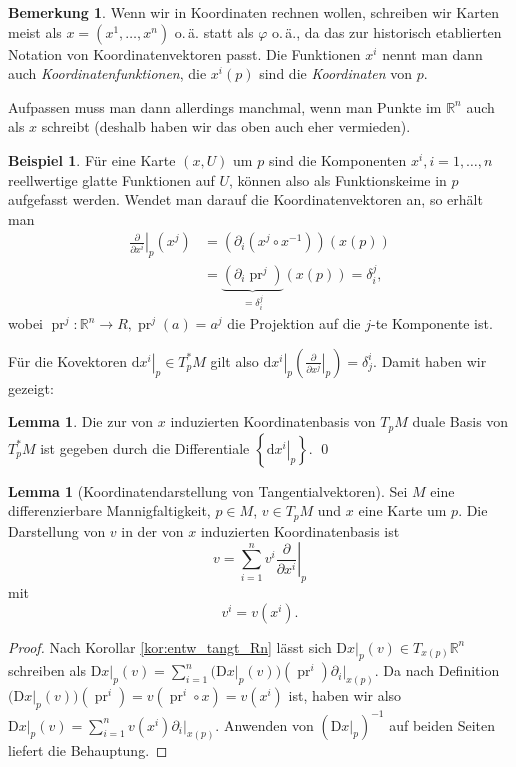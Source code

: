 \documentclass[a4paper]{scrreprt}
\numberwithin{equation}{chapter}
\newcommand{\D}{\mathrm{d}}
\newcommand{\DD}{\mathrm{D}}
\DeclareMathOperator{\pr}{pr}
\newcommand{\R}{\mathbb{R}}
\theoremstyle{definition}
\newtheorem{lemma}[defn]{Lemma}
\newtheorem{bem}[defn]{Bemerkung}
\newtheorem{bsp}[defn]{Beispiel}
\begin{document}
\begin{bem}
	Wenn wir in Koordinaten rechnen wollen, schreiben wir Karten meist als $x = (x^1, \dots, x^n)$ o.\,ä. statt als $\varphi$ o.\,ä., da das zur historisch etablierten Notation von Koordinatenvektoren passt. Die Funktionen $x^i$ nennt man dann auch \emph{Koordinatenfunktionen}, die $x^i(p)$ sind die \emph{Koordinaten} von $p$.

	Aufpassen muss man dann allerdings manchmal, wenn man Punkte im $\mathbb R^n$ auch als $x$ schreibt (deshalb haben wir das oben auch eher vermieden).
\end{bem}

\begin{bsp}
	Für eine Karte $(x,U)$ um $p$ sind die Komponenten $x^i, i = 1,\dots, n$ reellwertige glatte Funktionen auf $U$, können also als Funktionskeime in $p$ aufgefasst werden. Wendet man darauf die Koordinatenvektoren an, so erhält man
	\begin{align*}
		\left.\frac{\partial}{\partial x^i}\right|_p (x^j) &= \left(\partial_i \left(x^j\circ x^{-1}\right)\right) (x(p))\\
		&= \underbrace{\left(\partial_i \pr^j\right)}_{= \delta^j_i} (x(p)) = \delta^j_i,
	\end{align*}
	wobei $\pr^j\colon \mathbb R^n \to R, \pr^j(a) = a^j$ die Projektion auf die $j$-te Komponente ist.
\end{bsp}
Für die Kovektoren $\left.\D x^i\right|_p \in T_p^*M$ gilt also $\left.\D x^i\right|_p\left(\left.\frac{\partial}{\partial x^j}\right|_p\right) = \delta^i_j$. Damit haben wir gezeigt:
\begin{lemma}
	Die zur von $x$ induzierten Koordinatenbasis von $T_pM$ duale Basis von $T_p^*M$ ist gegeben durch die Differentiale $\left\{\left.\D x^i\right|_p \right\}$. \qed
\end{lemma}

\begin{lemma}[Koordinatendarstellung von Tangentialvektoren]
	Sei $M$ eine differenzierbare Mannigfaltigkeit, $p \in M$, $v \in T_pM$ und $x$ eine Karte um $p$. Die Darstellung von $v$ in der von $x$ induzierten Koordinatenbasis ist
	\[v = \sum_{i=1}^n v^i \left.\frac{\partial}{\partial x^i}\right|_p\]
	mit
	\[v^i = v(x^i).\]

	\begin{proof}
		Nach Korollar \ref{kor:entw_tangt_Rn} lässt sich $\left.\DD x\right|_p(v) \in T_{x(p)}\R^n$ schreiben als $\left.\DD x\right|_p(v) = \sum_{i=1}^n \Big(\DD x\big|_p(v)\Big) (\pr^i) \left.\partial_i\right|_{x(p)}$. Da nach Definition $\Big(\DD x\big|_p(v)\Big) (\pr^i) = v(\pr^i \circ x) = v(x^i)$ ist, haben wir also $\left.\DD x\right|_p(v) = \sum_{i=1}^n v(x^i) \left.\partial_i\right|_{x(p)}$.
		Anwenden von $\left(\left.\DD x\right|_p\right)^{-1}$ auf beiden Seiten liefert die Behauptung.
	\end{proof}
\end{lemma}
\end{document}
